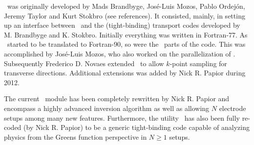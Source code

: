 \tsiesta\ was originally developed by Mads Brandbyge,
Jos\'e-Luis Mozos, Pablo Ordej\'on, Jeremy Taylor and Kurt Stokbro
(see references). It consisted, mainly, in setting up an interface
between \siesta\ and the (tight-binding) transport codes developed
by M. Brandbyge and K. Stokbro. Initially everything was written in
Fortran-77. As \siesta\ started to be translated to Fortran-90, so
were the \tsiesta\ parts of the code. This was accomplished by
Jos\'e-Luis Mozos, who also worked on the parallelization of
\tsiesta. 
%
Subsequently Frederico D. Novaes extended \tsiesta\ to allow $k$-point
sampling for transverse directions. Additional extensions was
added by Nick R. Papior during 2012.

The current \tsiesta\ module has been completely rewritten by Nick
R. Papior and encompass a highly advanced inversion algorithm as well
as allowing $N$ electrode setups among many new features. Furthermore,
the utility \tbtrans\ has also been fully re-coded (by Nick R. Papior)
to be a generic tight-binding code capable of analyzing physics from
the Greens function perspective in $N\ge1$ setups.


